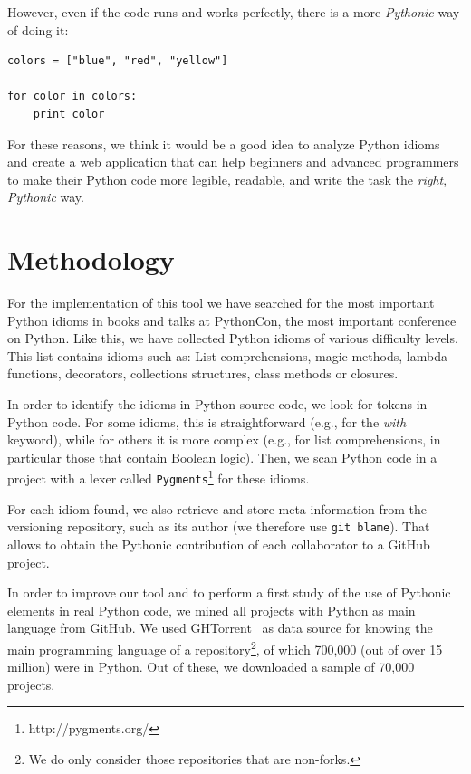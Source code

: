 \documentclass[a4paper]{article}
\begin{document}
However, even if the code runs and works perfectly, there is a more \emph{Pythonic} way of
doing it:

\begin{verbatim}
colors = ["blue", "red", "yellow"]

for color in colors:
    print color
\end{verbatim}

For these reasons, we think it would be a good idea to analyze Python idioms and create a web application that can help beginners and advanced programmers to make their Python code more legible, readable, and write the task the \emph{right}, \emph{Pythonic} way.

\section{Methodology}

For the implementation of this tool we have searched for the most important Python idioms in books and talks at PythonCon, the most important conference on Python. Like this, we have collected Python idioms of various difficulty levels. This list contains idioms such as: List comprehensions, magic methods, lambda functions, decorators, collections structures, class methods or closures.

In order to identify the idioms in Python source code, we look for tokens in Python code. For some idioms, this is straightforward (e.g., for the \emph{with} keyword), while for others it is more complex (e.g., for list comprehensions, in particular those that contain Boolean logic). Then, we scan Python code in a project with a lexer called \texttt{Pygments}\footnote{http://pygments.org/} for these idioms.

For each idiom found, we also retrieve and store meta-information from the versioning repository, such as its author (we therefore use \texttt{git blame}). That allows to obtain the Pythonic contribution of each collaborator to a GitHub project.

In order to improve our tool and to perform a first study of the use of Pythonic elements in real Python code, we mined all projects with Python as main language from GitHub. We used GHTorrent~\cite{gousios2012ghtorrent} as data source for knowing the main programming language of a repository\footnote{We do only consider those repositories that are non-forks.}, of which 700,000 (out of over 15 million) were in Python. Out of these, we downloaded a sample of 70,000 projects.
\end{document}
